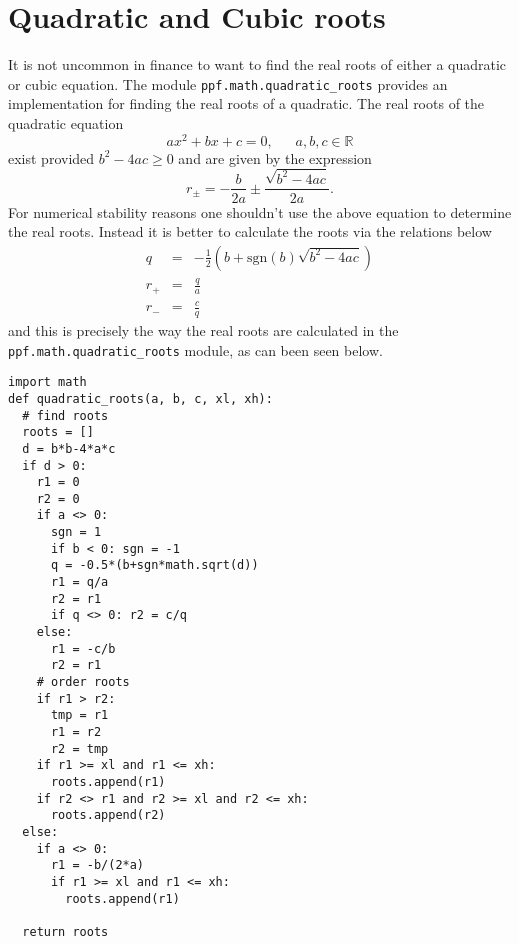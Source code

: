 \section{Quadratic and Cubic roots}
It is not uncommon in finance to want to find the real roots of either
a quadratic or cubic equation. The module
\verb|ppf.math.quadratic_roots| provides an implementation for finding
the real roots of a quadratic. The real roots of the quadratic
equation
\begin{equation}
ax^2+bx+c = 0, ~~~~~~~a,b,c \in \mathbb R
\end{equation}
exist provided $b^2-4ac \ge 0$ and are given by the expression
\begin{equation}
r_{\pm} = -\frac{b}{2a} \pm \frac{\sqrt{b^2-4ac}}{2a}.
\end{equation}
For numerical stability reasons one shouldn't use the above equation
to determine the real roots. Instead it is better to calculate the
roots via the relations below
\begin{eqnarray}
q &=& -\frac{1}{2}\left(b+\mbox{sgn}(b)\sqrt{b^2-4ac}\right) \\
r_{+} &=& \frac{q}{a} \\
r_{-} &=& \frac{c}{q}
\end{eqnarray}
and this is precisely the way the real roots are calculated in the
\verb|ppf.math.quadratic_roots| module, as can been seen below.
\begin{verbatim}
import math
def quadratic_roots(a, b, c, xl, xh):
  # find roots
  roots = []
  d = b*b-4*a*c
  if d > 0:
    r1 = 0
    r2 = 0
    if a <> 0:
      sgn = 1
      if b < 0: sgn = -1
      q = -0.5*(b+sgn*math.sqrt(d))
      r1 = q/a
      r2 = r1
      if q <> 0: r2 = c/q
    else:
      r1 = -c/b
      r2 = r1
    # order roots
    if r1 > r2:
      tmp = r1
      r1 = r2
      r2 = tmp
    if r1 >= xl and r1 <= xh:
      roots.append(r1)
    if r2 <> r1 and r2 >= xl and r2 <= xh:
      roots.append(r2)
  else:
    if a <> 0:
      r1 = -b/(2*a)
      if r1 >= xl and r1 <= xh:
        roots.append(r1)

  return roots
\end{verbatim}

